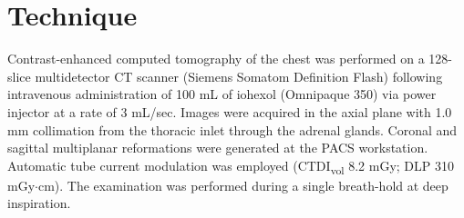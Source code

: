 \section{Technique}

Contrast-enhanced computed tomography of the chest was performed on a 128-slice multidetector CT scanner (Siemens Somatom Definition Flash) following intravenous administration of 100 mL of iohexol (Omnipaque 350) via power injector at a rate of 3 mL/sec. Images were acquired in the axial plane with 1.0 mm collimation from the thoracic inlet through the adrenal glands. Coronal and sagittal multiplanar reformations were generated at the PACS workstation. Automatic tube current modulation was employed (CTDI\textsubscript{vol} 8.2 mGy; DLP 310 mGy$\cdot$cm). The examination was performed during a single breath-hold at deep inspiration.
